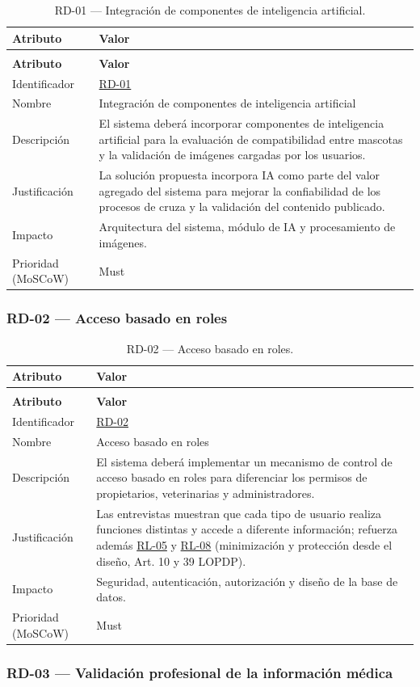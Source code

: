 \documentclass[journal,onecolumn]{IEEEtran}
\makeatletter
\newenvironment{atributos}[2]{%
	\small
	\begin{longtable}{@{}>{\raggedright\arraybackslash}p{4.2cm} >{\raggedright\arraybackslash}p{11.2cm}@{}}
		\caption{#2}\label{tab:#1}\\
		\toprule
		\textbf{Atributo} & \textbf{Valor} \\
		\midrule
		\endfirsthead
		\multicolumn{2}{@{}l}{\small\itshape (continuación)}\\
		\toprule
		\textbf{Atributo} & \textbf{Valor} \\
		\midrule
		\endhead
		\bottomrule
		\endlastfoot
	}{%
	\end{longtable}
	\normalsize
}
\makeatother
\begin{document}
	\begin{atributos}{RD-01}{RD-01 --- Integración de componentes de inteligencia artificial.}
		Identificador & \hyperref[tab:RD-01]{RD-01} \\
		Nombre & Integración de componentes de inteligencia artificial \\
		Descripción & El sistema deberá incorporar componentes de inteligencia artificial para la evaluación de compatibilidad entre mascotas y la validación de imágenes cargadas por los usuarios. \\
		Justificación & La solución propuesta incorpora IA como parte del valor agregado del sistema para mejorar la confiabilidad de los procesos de cruza y la validación del contenido publicado. \\
		Impacto & Arquitectura del sistema, módulo de IA y procesamiento de imágenes. \\
		Prioridad (MoSCoW) & Must \\
	\end{atributos}
	
	\subsubsection{RD-02 --- Acceso basado en roles}
	
	\begin{atributos}{RD-02}{RD-02 --- Acceso basado en roles.}
		Identificador & \hyperref[tab:RD-02]{RD-02} \\
		Nombre & Acceso basado en roles \\
		Descripción & El sistema deberá implementar un mecanismo de control de acceso basado en roles para diferenciar los permisos de propietarios, veterinarias y administradores. \\
		Justificación & Las entrevistas muestran que cada tipo de usuario realiza funciones distintas y accede a diferente información; refuerza además \hyperref[rl:05]{RL-05} y \hyperref[rl:08]{RL-08} (minimización y protección desde el diseño, Art. 10 y 39 LOPDP). \\
		Impacto & Seguridad, autenticación, autorización y diseño de la base de datos. \\
		Prioridad (MoSCoW) & Must \\
	\end{atributos}
	
	\subsubsection{RD-03 --- Validación profesional de la información médica}
	
\end{document}
